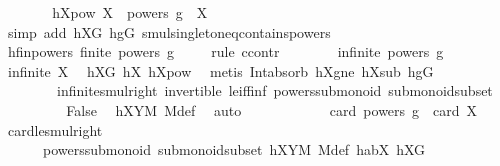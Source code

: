 \begin{isabellebody}
\ \ \ \ \isamarkupfalse%
\ \isamarkupfalse%
\ hXpow{\isacharcolon}{\kern0pt}\ {\isachardoublequoteopen}X\ {\isasymcdots}\ {\isacharparenleft}{\kern0pt}powers\ g{\isacharparenright}{\kern0pt}\ {\isacharequal}{\kern0pt}\ X{\isachardoublequoteclose}\ \isamarkupfalse%
\ {\isacharparenleft}{\kern0pt}simp\ add{\isacharcolon}{\kern0pt}\ hXG\ hgG\ smul{\isacharunderscore}{\kern0pt}singleton{\isacharunderscore}{\kern0pt}eq{\isacharunderscore}{\kern0pt}contains{\isacharunderscore}{\kern0pt}powers{\isacharparenright}{\kern0pt}\isanewline
\ \ \ \ \isamarkupfalse%
\ \isamarkupfalse%
\ hfinpowers{\isacharcolon}{\kern0pt}\ {\isachardoublequoteopen}finite\ {\isacharparenleft}{\kern0pt}powers\ g{\isacharparenright}{\kern0pt}{\isachardoublequoteclose}\isanewline
\ \ \ \ \isamarkupfalse%
{\isacharparenleft}{\kern0pt}rule\ ccontr{\isacharparenright}{\kern0pt}\isanewline
\ \ \ \ \ \ \isamarkupfalse%
\ {\isachardoublequoteopen}infinite\ {\isacharparenleft}{\kern0pt}powers\ g{\isacharparenright}{\kern0pt}{\isachardoublequoteclose}\isanewline
\ \ \ \ \ \ \isamarkupfalse%
\ \isamarkupfalse%
\ {\isachardoublequoteopen}infinite\ X{\isachardoublequoteclose}\ \isamarkupfalse%
\ hXG\ hX{}\ hXpow\ \isamarkupfalse%
\ {\isacharparenleft}{\kern0pt}metis\ Int{\isacharunderscore}{\kern0pt}absorb{}\ hXgne\ hXsub\ hgG\ \isanewline
\ \ \ \ \ \ \ \ infinite{\isacharunderscore}{\kern0pt}smul{\isacharunderscore}{\kern0pt}right\ invertible\ le{\isacharunderscore}{\kern0pt}iff{\isacharunderscore}{\kern0pt}inf\ powers{\isacharunderscore}{\kern0pt}submonoid\ submonoid{\isachardot}{\kern0pt}subset{\isacharparenright}{\kern0pt}\isanewline
\ \ \ \ \ \ \isamarkupfalse%
\ \isamarkupfalse%
\ False\ \isamarkupfalse%
\ hXYM\ M{\isacharunderscore}{\kern0pt}def\ \isamarkupfalse%
\ auto\isanewline
\ \ \ \ \isamarkupfalse%
\isanewline
\ \ \ \ \isamarkupfalse%
\ \isamarkupfalse%
\ {\isachardoublequoteopen}card\ {\isacharparenleft}{\kern0pt}powers\ g{\isacharparenright}{\kern0pt}\ {\isasymle}\ card\ X{\isachardoublequoteclose}\ \isamarkupfalse%
\ card{\isacharunderscore}{\kern0pt}le{\isacharunderscore}{\kern0pt}smul{\isacharunderscore}{\kern0pt}right\ \isanewline
\ \ \ \ \ \ powers{\isacharunderscore}{\kern0pt}submonoid\ submonoid{\isachardot}{\kern0pt}subset\ hXYM\ M{\isacharunderscore}{\kern0pt}def\ habX\ hXG\ \isanewline

\end{isabellebody}
